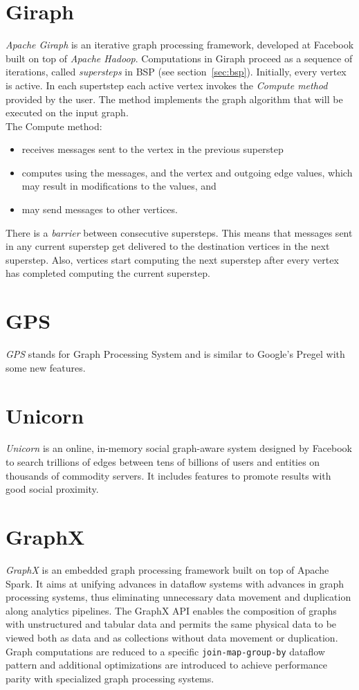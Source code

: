 \documentclass[letterpaper,twocolumn,10pt]{article}
\begin{document}
\section{Giraph}
\textit{Apache Giraph} is an iterative graph processing framework, developed at Facebook built on top of \textit{Apache  Hadoop}.
Computations in Giraph proceed as a sequence of iterations, called \textit{supersteps} in BSP (see section~\ref{sec:bsp}). Initially, every vertex is active. In each supertstep each active vertex invokes the \textit{Compute method} provided by the user. The method implements the graph algorithm that will be executed on the input graph. \\
The Compute method:
\begin{itemize}
\item receives messages sent to the vertex in the previous superstep
\item computes using the messages, and the vertex and outgoing edge values, which may result in modifications to the values, and
\item may send messages to other vertices.
\end{itemize}
There is a \textit{barrier} between consecutive supersteps. This means that messages sent in any current superstep get delivered to the destination vertices in the next superstep. Also, vertices start computing the next superstep after every vertex has completed computing the current superstep.

\section{GPS}
\textit{GPS} stands for Graph Processing System and is similar to Google's Pregel with some new features.

\section{Unicorn}
\textit{Unicorn} is an online, in-memory social graph-aware system designed by Facebook to search trillions of edges between tens of billions of users and entities on thousands of commodity servers. It includes features to promote results with good social proximity.

\section{GraphX}
\textit{GraphX} is an embedded graph processing framework built on top of Apache Spark. It aims at unifying advances in dataflow systems with advances in graph processing systems, thus eliminating unnecessary data movement and duplication along analytics pipelines. The GraphX API enables the composition of graphs with unstructured and tabular data and permits the same physical data to be viewed both as data and as collections without data movement or duplication.
Graph computations are reduced to a specific {\tt join-map-group-by} dataflow pattern and additional optimizations are introduced to achieve performance parity with specialized graph processing systems.
\end{document}
